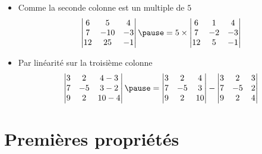 
\begin{frame}

\begin{exemple}
\begin{itemize}
  \item Comme la seconde colonne est un multiple de $5$ 
  $$\begin{vmatrix}
6&5&4\\7&-10&-3\\12&25&-1    
  \end{vmatrix}
\pause =
5\times\begin{vmatrix}
6&1&4\\7&-2&-3\\12&5&-1    
  \end{vmatrix} $$
 

  \item \pause Par linéarité sur la troisième colonne
$$
  \begin{vmatrix}
3&2&4-3\\7&-5&3-2\\9&2&10-4\\   
  \end{vmatrix}
\pause =
\begin{vmatrix}
3&2&4\\7&-5&3\\9&2&10\\   
  \end{vmatrix}
  - \begin{vmatrix}
3&2&3\\7&-5&2\\9&2&4\\   
  \end{vmatrix}
$$
\end{itemize}
\end{exemple}

\end{frame}

\section{Premières propriétés}

